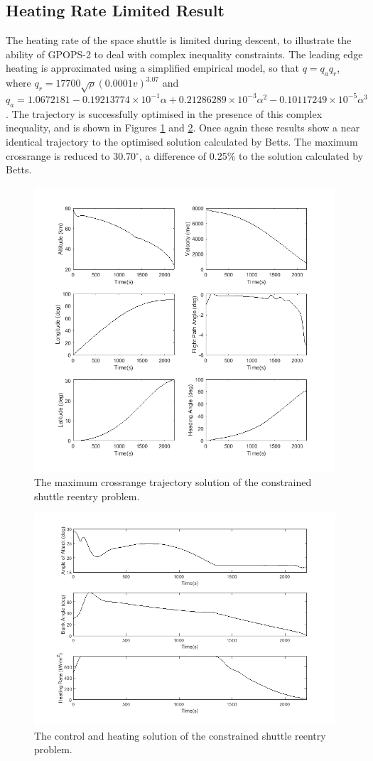 \subsection{Heating Rate Limited Result}
The heating rate of the space shuttle is limited during descent, to illustrate the ability of GPOPS-2 to deal with complex inequality constraints. The leading edge heating is approximated using a simplified empirical model, so that $q = q_aq_r$, where $q_r = 17700\sqrt{\rho}(0.0001v)^{3.07}$ and $q_a = 1.0672181 -0.19213774\times10^{-1}
\alpha + 0.21286289\times10^{-3}\alpha^2 -0.10117249\times10^{-5}\alpha^3$. The trajectory is successfully optimised in the presence of this complex inequality, and is shown in Figures \ref{fig:SpaceShuttleq1} and \ref{fig:SpaceShuttleq2}. Once again these results show a near identical trajectory to the optimised solution calculated by Betts\cite{Betts2009}. The maximum crossrange is reduced to 30.70$^\circ$, a difference of 0.25\% to the solution calculated by Betts\cite{Betts2009}.
\begin{figure}[H]
\centering
\includegraphics[width=0.7\linewidth]{figures/A1_uncertainty-analysis/SpaceShuttleq1}
\caption{The maximum crossrange trajectory solution of the constrained shuttle reentry problem.}
\label{fig:SpaceShuttleq1}
\end{figure}
\begin{figure}[H]
\centering
\includegraphics[width=0.7\linewidth]{figures/A1_uncertainty-analysis/SpaceShuttleq2}
\caption{The control and heating solution of the constrained shuttle reentry problem.}
\label{fig:SpaceShuttleq2}
\end{figure}

